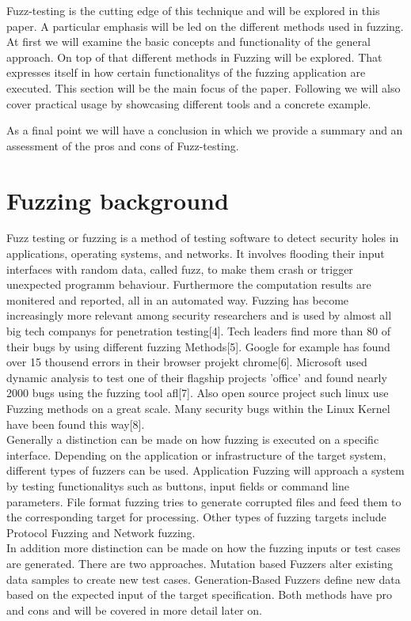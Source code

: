 \documentclass[journal=tosc,final]{iacrtrans}
\begin{document}
Fuzz-testing is the cutting edge of this technique and will be explored in this paper. A particular emphasis will be led on the different methods used in fuzzing. 
At first we will examine the basic concepts and functionality of the general approach. On top of that different methods in Fuzzing will be explored. That expresses itself in how certain functionalitys of the fuzzing application are executed. This section will be the main focus of the paper. Following we will also cover practical usage by showcasing different tools and a concrete example. 

As a final point we will have a conclusion in which we provide a summary and an assessment of the pros and cons of Fuzz-testing. 
\newpage
\section{Fuzzing background}
Fuzz testing or fuzzing is a method of testing software to detect security holes in applications, operating systems, and networks. It involves flooding their input interfaces with random data, called fuzz, to make them crash or trigger unexpected programm behaviour. Furthermore the computation results are monitered and reported, all in an automated way. Fuzzing has become increasingly more relevant among security researchers and is used by almost all big tech companys for penetration testing[4]. Tech leaders find more than 80 of their bugs by using different fuzzing Methods[5]. Google for example  has found over 15 thousend errors in their browser projekt chrome[6]. Microsoft used dynamic analysis to test one of their flagship projects 'office' and found nearly 2000 bugs using the fuzzing tool afl[7]. Also open source project such linux use Fuzzing methods on a great scale. Many security bugs within the Linux Kernel have been found this way[8].\\
Generally a distinction can be made on how fuzzing is executed on a specific interface. Depending on the application or infrastructure of the target system, different types of fuzzers can be used. Application Fuzzing will approach a system by testing functionalitys such as buttons, input fields or command line parameters. File format fuzzing tries to generate corrupted files and feed them to the corresponding target for processing. Other types of fuzzing targets include Protocol Fuzzing and Network fuzzing.\\
In addition more distinction can be made on how the fuzzing inputs or test cases are generated. There are two approaches. Mutation based Fuzzers alter existing data samples to create new test cases. Generation-Based Fuzzers define new data based on the expected input of the target specification. Both methods have pro and cons and will be covered in more detail later on.
\end{document}
